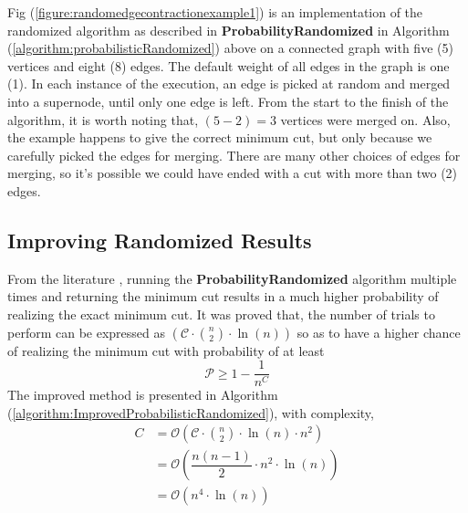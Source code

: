 \documentclass[longpaper, english, final, times]{revdetua}
\begin{document}
			
			Fig (\ref{figure:randomedgecontractionexample1}) is an implementation of the randomized algorithm as described in \textbf{ProbabilityRandomized} in Algorithm (\ref{algorithm:probabilisticRandomized}) above on a connected graph with five (5) vertices and eight (8) edges. The default weight of all edges in the graph is one (1). In each instance of the execution, an edge is picked at random and merged into a supernode, until only one edge is left. From the start to the finish of the algorithm, it is worth noting that, $(5-2)=3$ vertices were merged on. Also, the example happens to give the correct minimum cut, but only because we carefully picked the edges for merging. There are many other choices of edges for merging, so it's possible we could have ended with a cut with more than two (2) edges.\\
		
		\subsection{Improving Randomized Results}
			From the literature \cite{mincutandkargersalgorithm}, running the \textbf{ProbabilityRandomized} algorithm multiple times and returning the minimum cut results in a much higher probability of realizing the exact minimum cut. It was proved that, the number of trials to perform can be expressed as $\left(\mathcal{C}\cdot {n\choose 2}\cdot \ln (n)\right)$ so as to have a higher chance of realizing the minimum cut with probability of at least $$\mathcal{P}\ge 1-\dfrac{1}{n^C}$$
			The improved method is presented in Algorithm (\ref{algorithm:ImprovedProbabilisticRandomized}), with complexity, 
			\begin{align*}
				C &=\mathcal{O}\left(\mathcal{C}\cdot {n\choose 2}\cdot \ln (n) \cdot n^2 \right)\\
				&= \mathcal{O}\left(\dfrac{n(n-1)}{2}\cdot n^2\cdot \ln(n)\right)\\
				&=\mathcal{O}\left(n^4\cdot \ln(n)\right)
			\end{align*}
			
\end{document}
